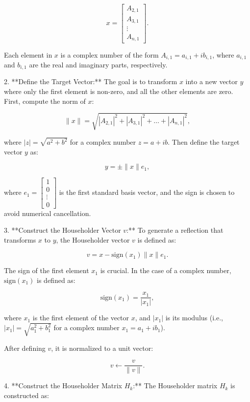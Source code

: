 \documentclass[12pt]{article}
\begin{document}
   \[
   x = \begin{bmatrix}
   A_{2,1} \\
   A_{3,1} \\
   \vdots \\
   A_{n,1}
   \end{bmatrix}.
   \]

   Each element in \( x \) is a complex number of the form \( A_{i,1} = a_{i,1} + ib_{i,1} \), where \( a_{i,1} \) and \( b_{i,1} \) are the real and imaginary parts, respectively.

2. **Define the Target Vector:**
   The goal is to transform \( x \) into a new vector \( y \) where only the first element is non-zero, and all the other elements are zero. First, compute the norm of \( x \):

   \[
   \| x \| = \sqrt{|A_{2,1}|^2 + |A_{3,1}|^2 + \dots + |A_{n,1}|^2},
   \]

   where \( |z| = \sqrt{a^2 + b^2} \) for a complex number \( z = a + ib \). Then define the target vector \( y \) as:

   \[
   y = \pm \| x \| e_1,
   \]

   where \( e_1 = \begin{bmatrix} 1 \\ 0 \\ \vdots \\ 0 \end{bmatrix} \) is the first standard basis vector, and the sign is chosen to avoid numerical cancellation.

3. **Construct the Householder Vector \( v \):**
   To generate a reflection that transforms \( x \) to \( y \), the Householder vector \( v \) is defined as:

   \[
   v = x - \text{sign}(x_1) \| x \| e_1.
   \]

   The sign of the first element \( x_1 \) is crucial. In the case of a complex number, \( \text{sign}(x_1) \) is defined as:

   \[
   \text{sign}(x_1) = \frac{x_1}{|x_1|},
   \]

   where \( x_1 \) is the first element of the vector \( x \), and \( |x_1| \) is its modulus (i.e., \( |x_1| = \sqrt{a_1^2 + b_1^2} \) for a complex number \( x_1 = a_1 + ib_1 \)).

   After defining \( v \), it is normalized to a unit vector:

   \[
   v \leftarrow \frac{v}{\|v\|}.
   \]

4. **Construct the Householder Matrix \( H_k \):**
   The Householder matrix \( H_k \) is constructed as:
\end{document}
